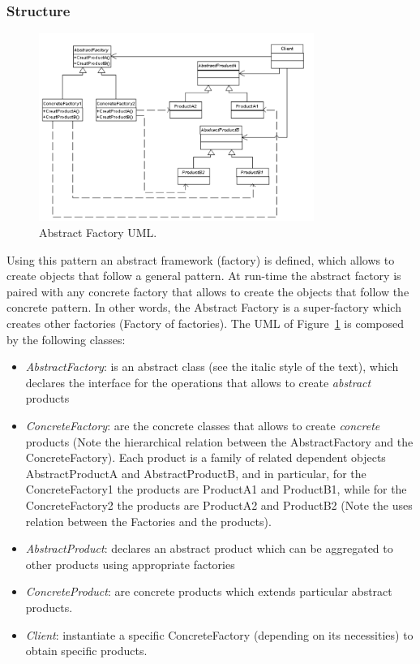 \documentclass{article}
\begin{document}
\subsubsection{Structure}

\begin{figure}[h!]
  \centering
    \includegraphics[width=0.8\textwidth]{Img/AbstractFactoryUML.png}
     \caption{Abstract Factory UML.}
     \label{AbstractFactoryUML}
\end{figure}

Using this pattern an abstract framework (factory) is defined, which allows to create objects that follow a general pattern. At run-time the abstract factory is paired with any concrete factory that allows to create the objects that follow the concrete pattern. In other words, the Abstract Factory is a super-factory which creates other factories (Factory of factories). The UML of Figure~\ref{AbstractFactoryUML} is composed by the following classes:
\begin{itemize}
\item \emph{AbstractFactory}: is an abstract class (see the italic style of the text), which declares the interface for the operations that allows to create \emph{abstract} products
\item \emph{ConcreteFactory}: are the concrete classes that allows to create \emph{concrete} products (Note the hierarchical relation between the AbstractFactory and the ConcreteFactory). Each product is a family of related dependent objects AbstractProductA and AbstractProductB, and in particular, for the ConcreteFactory1 the products are ProductA1 and ProductB1, while for the ConcreteFactory2 the products are ProductA2 and ProductB2 (Note the uses relation between the Factories and the products).
\item \emph{AbstractProduct}:  declares an abstract product which can be aggregated to other products using appropriate factories
\item \emph{ConcreteProduct}: are  concrete products which extends  particular abstract products.
\item \emph{Client}: instantiate a specific ConcreteFactory (depending on its necessities) to obtain specific products.
\end{itemize}
\end{document}
